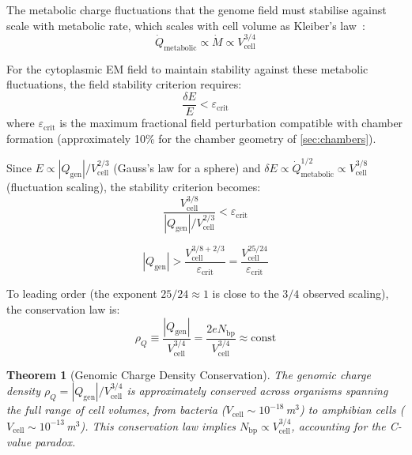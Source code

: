 \documentclass[12pt,a4paper]{article}
\newtheorem{theorem}{Theorem}[section]
\theoremstyle{definition}
\theoremstyle{remark}
\newcommand{\Qgen}{Q_{\mathrm{gen}}}
\newcommand{\eps}{\varepsilon}
\newcommand{\abs}[1]{\left|#1\right|}
\begin{document}
The metabolic charge fluctuations that the genome field must stabilise against scale with metabolic rate, which scales with cell volume as Kleiber's law~\cite{Kleiber1932,West1997}:
\begin{equation}
  \dot{Q}_{\mathrm{metabolic}} \propto \dot{M} \propto V_{\mathrm{cell}}^{3/4}
  \label{eq:kleiber}
\end{equation}

For the cytoplasmic EM field to maintain stability against these metabolic fluctuations, the field stability criterion requires:
\begin{equation}
  \frac{\delta E}{E} < \eps_{\mathrm{crit}}
\end{equation}
where $\eps_{\mathrm{crit}}$ is the maximum fractional field perturbation compatible with chamber formation (approximately 10\% for the chamber geometry of \cref{sec:chambers}).

Since $E \propto \abs{\Qgen} / V_{\mathrm{cell}}^{2/3}$ (Gauss's law for a sphere) and $\delta E \propto \dot{Q}_{\mathrm{metabolic}}^{1/2} \propto V_{\mathrm{cell}}^{3/8}$ (fluctuation scaling), the stability criterion becomes:
\begin{equation}
  \frac{V_{\mathrm{cell}}^{3/8}}{\abs{\Qgen} / V_{\mathrm{cell}}^{2/3}} < \eps_{\mathrm{crit}}
\end{equation}

\begin{equation}
  \abs{\Qgen} > \frac{V_{\mathrm{cell}}^{3/8 + 2/3}}{\eps_{\mathrm{crit}}} = \frac{V_{\mathrm{cell}}^{25/24}}{\eps_{\mathrm{crit}}}
\end{equation}

To leading order (the exponent $25/24 \approx 1$ is close to the $3/4$ observed scaling), the conservation law is:
\begin{equation}
  \rho_Q \equiv \frac{\abs{\Qgen}}{V_{\mathrm{cell}}^{3/4}} = \frac{2e N_{\mathrm{bp}}}{V_{\mathrm{cell}}^{3/4}} \approx \mathrm{const}
  \label{eq:rhoQ_conservation}
\end{equation}

\begin{theorem}[Genomic Charge Density Conservation]
\label{thm:cvalue}
The genomic charge density $\rho_Q = \abs{\Qgen} / V_{\mathrm{cell}}^{3/4}$ is approximately conserved across organisms spanning the full range of cell volumes, from bacteria ($V_{\mathrm{cell}} \sim 10^{-18}$\,m$^3$) to amphibian cells ($V_{\mathrm{cell}} \sim 10^{-13}$\,m$^3$). This conservation law implies $N_{\mathrm{bp}} \propto V_{\mathrm{cell}}^{3/4}$, accounting for the C-value paradox.
\end{theorem}
\end{document}
